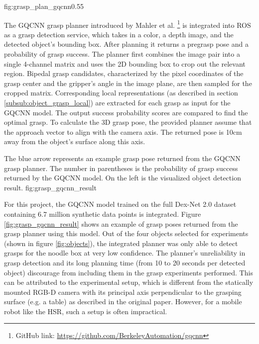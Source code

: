              {fig:grasp_plan_gqcnn}{0.55\textwidth}

The GQCNN grasp planner introduced by Mahler et al. \footnote{GitHub link:
\url{https://github.com/BerkeleyAutomation/gqcnn}} \cite{mahler2017} is integrated into ROS as a grasp detection
service, which takes in a color, a depth image, and the detected object's bounding box. After planning it returns a
pregrasp pose and a probability of grasp success. The planner first combines the image pair into a single 4-channel
matrix and uses the 2D bounding box to crop out the relevant region. Bipedal grasp candidates, characterized by the
pixel coordinates of the grasp center and the gripper's angle in the image plane, are then sampled for the cropped
matrix. Corresponding local representations (as described in section \ref{subsub:object_grasp_local}) are extracted for
each grasp as input for the GQCNN model. The output success probability scores are compared to find the optimal grasp.
To calculate the 3D grasp pose, the provided planner assume that the approach vector to align with the camera axis. The
returned pose is 10cm away from the object's surface along this axis.

             {The blue arrow represents an example grasp pose returned from the GQCNN grasp planner. The number
              in parentheses is the probability of grasp success returned by the GQCNN model. On the left is the
              visualized object detection result.}
             {fig:grasp_gqcnn_result}{\textwidth}

For this project, the GQCNN model trained on the full Dex-Net 2.0 dataset containing 6.7 million synthetic data points
\cite{mahler2017} is integrated. Figure \ref{fig:grasp_gqcnn_result} shows an example of grasp poses returned from the
grasp planner using this model. Out of the four objects selected for experiments (shown in figure \ref{fig:objects}),
the integrated planner was only able to detect grasps for the noodle box at very low confidence. The planner's
unreliability in grasp detection and its long planning time (from 10 to 20 seconds per detected object) discourage from
including them in the grasp experiments performed. This can be attributed to the experimental setup, which is different
from the statically mounted RGB-D camera with its principal axis perpendicular to the grasping surface (e.g. a table)
as
described in the original paper. However, for a mobile robot like the HSR, such a setup is often impractical.


